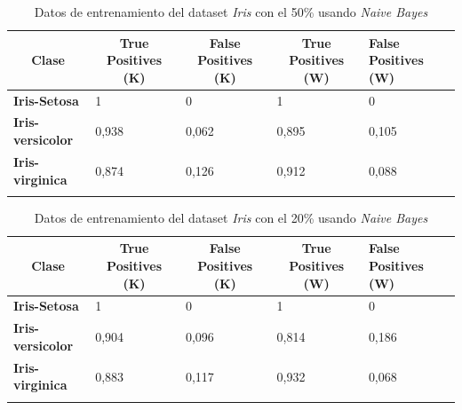 \documentclass[10pt,a4paper]{article}
\begin{document}
\begin{table}[h!]
	\begin{tabular}{lllll}
		\hline
		\multicolumn{1}{|c|}{\textbf{Clase}} & \multicolumn{1}{c|}{\textbf{True Positives (K)}} & \multicolumn{1}{c|}{\textbf{False Positives (K)}} & \multicolumn{1}{c|}{\textbf{True Positives (W)}} & \multicolumn{1}{l|}{\textbf{False Positives (W)}} \\ \hline
		\multicolumn{1}{|l|}{\textbf{Iris-Setosa}} & \multicolumn{1}{l|}{1}          & \multicolumn{1}{l|}{0}          & \multicolumn{1}{l|}{1}          & \multicolumn{1}{l|}{0} \\ \hline
		\multicolumn{1}{|l|}{\textbf{Iris-versicolor}} & \multicolumn{1}{l|}{0,938}          & \multicolumn{1}{l|}{0,062}          & \multicolumn{1}{l|}{0,895}          & \multicolumn{1}{l|}{0,105} \\ \hline
		\multicolumn{1}{|l|}{\textbf{Iris-virginica}} & \multicolumn{1}{l|}{0,874}          & \multicolumn{1}{l|}{0,126}          & \multicolumn{1}{l|}{0,912}          & \multicolumn{1}{l|}{0,088}\\ \hline
		\textbf{}                       &                                &                                &                                &                      
		
	\end{tabular}
	\caption{Datos de entrenamiento del dataset \emph{Iris} con el 50\% usando \emph{Naive Bayes}}
	\label{tab:iris_bayes_50}
\end{table}


\begin{table}[h!]
	\begin{tabular}{lllll}
		\hline
		\multicolumn{1}{|c|}{\textbf{Clase}} & \multicolumn{1}{c|}{\textbf{True Positives (K)}} & \multicolumn{1}{c|}{\textbf{False Positives (K)}} & \multicolumn{1}{c|}{\textbf{True Positives (W)}} & \multicolumn{1}{l|}{\textbf{False Positives (W)}} \\ \hline
		\multicolumn{1}{|l|}{\textbf{Iris-Setosa}} & \multicolumn{1}{l|}{1}          & \multicolumn{1}{l|}{0}          & \multicolumn{1}{l|}{1}          & \multicolumn{1}{l|}{0} \\ \hline
		\multicolumn{1}{|l|}{\textbf{Iris-versicolor}} & \multicolumn{1}{l|}{0,904}          & \multicolumn{1}{l|}{0,096}          & \multicolumn{1}{l|}{0,814}          & \multicolumn{1}{l|}{0,186} \\ \hline
		\multicolumn{1}{|l|}{\textbf{Iris-virginica}} & \multicolumn{1}{l|}{0,883}          & \multicolumn{1}{l|}{0,117}          & \multicolumn{1}{l|}{0,932}          & \multicolumn{1}{l|}{0,068}\\ \hline
		\textbf{}                       &                                &                                &                                &                      
		
	\end{tabular}
	\caption{Datos de entrenamiento del dataset \emph{Iris} con el 20\% usando \emph{Naive Bayes}}
	\label{tab:iris_bayes_20}
\end{table}
\newpage
\end{document}

